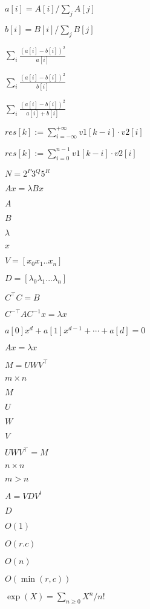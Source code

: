 \documentclass{article}
\begin{document}
$a[i] = A[i] / \sum_j A[j]$
\pagebreak

$b[i] = B[i] / \sum_j B[j]$
\pagebreak

$\displaystyle \sum_i \frac{ (a[i] - b[i])^2 }{ a[i] } $
\pagebreak

$\displaystyle \sum_i \frac{ (a[i] - b[i])^2 }{ b[i] } $
\pagebreak

$\displaystyle \sum_i \frac{ (a[i] - b[i])^2 }{ a[i] + b[i] } $
\pagebreak

$res[k] := \displaystyle\sum_{i=-\infty}^{+\infty} v1[k-i] \cdot v2[i]$
\pagebreak

$res[k] := \displaystyle\sum_{i=0}^{n-1} v1[k-i] \cdot v2[i]$
\pagebreak

$N = 2^P 3^Q 5^R$
\pagebreak

$A x = \lambda B x$
\pagebreak

$A$
\pagebreak

$B$
\pagebreak

$\lambda$
\pagebreak

$x$
\pagebreak

$V = [ x_0 x_1 .. x_n ]$
\pagebreak

$D = [ \lambda_0 \lambda_1 ... \lambda_n ]$
\pagebreak

$C^\top C = B$
\pagebreak

$C^{-\top} A C^{-1} x = \lambda x$
\pagebreak

$ a[0] x^d + a[1] x^{d-1} + \cdots + a[d] = 0 $
\pagebreak

$A x = \lambda x$
\pagebreak

$M = U W V^\top$
\pagebreak

$m \times n$
\pagebreak

$M$
\pagebreak

$U$
\pagebreak

$W$
\pagebreak

$V$
\pagebreak

$U W V^\top = M$
\pagebreak

$n \times n$
\pagebreak

$m > n$
\pagebreak

$A = V D V^t$
\pagebreak

$D$
\pagebreak

$O(1)$
\pagebreak

$O(r.c)$
\pagebreak

$O(n)$
\pagebreak

$O(\min(r,c))$
\pagebreak

$\exp(X) = \displaystyle\sum_{n \ge 0} X^n/n!$
\pagebreak
\end{document}

